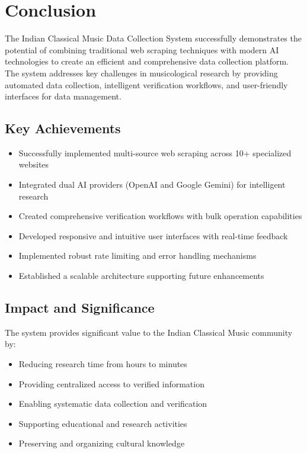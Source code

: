 \documentclass[12pt,a4paper]{article}
\begin{document}
\section{Conclusion}

The Indian Classical Music Data Collection System successfully demonstrates the potential of combining traditional web scraping techniques with modern AI technologies to create an efficient and comprehensive data collection platform. The system addresses key challenges in musicological research by providing automated data collection, intelligent verification workflows, and user-friendly interfaces for data management.

\subsection{Key Achievements}

\begin{itemize}
    \item Successfully implemented multi-source web scraping across 10+ specialized websites
    \item Integrated dual AI providers (OpenAI and Google Gemini) for intelligent research
    \item Created comprehensive verification workflows with bulk operation capabilities
    \item Developed responsive and intuitive user interfaces with real-time feedback
    \item Implemented robust rate limiting and error handling mechanisms
    \item Established a scalable architecture supporting future enhancements
\end{itemize}

\subsection{Impact and Significance}

The system provides significant value to the Indian Classical Music community by:

\begin{itemize}
    \item Reducing research time from hours to minutes
    \item Providing centralized access to verified information
    \item Enabling systematic data collection and verification
    \item Supporting educational and research activities
    \item Preserving and organizing cultural knowledge
\end{itemize}
\end{document}
